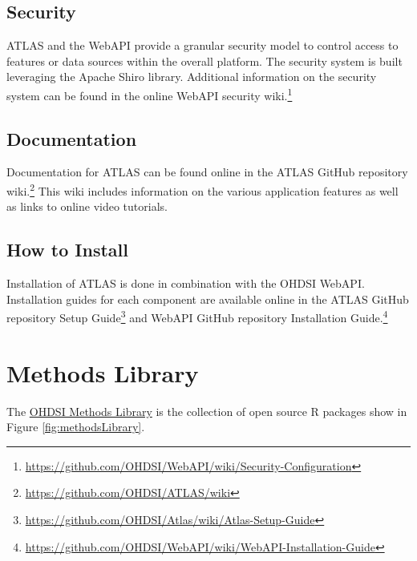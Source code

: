 \documentclass[11pt]{book}
\let\rmarkdownfootnote\footnote%
\def\footnote{\protect\rmarkdownfootnote}
\theoremstyle{definition}
\theoremstyle{definition}
\theoremstyle{definition}
\theoremstyle{remark}
\begin{document}
\subsection{Security}\label{security}

ATLAS and the WebAPI provide a granular security model to control access
to features or data sources within the overall platform. The security
system is built leveraging the Apache Shiro library. Additional
information on the security system can be found in the online WebAPI
security wiki.\footnote{\url{https://github.com/OHDSI/WebAPI/wiki/Security-Configuration}}

\subsection{Documentation}\label{documentation}

Documentation for ATLAS can be found online in the ATLAS GitHub
repository wiki.\footnote{\url{https://github.com/OHDSI/ATLAS/wiki}}
This wiki includes information on the various application features as
well as links to online video tutorials. 

\subsection{How to Install}\label{how-to-install}

Installation of ATLAS is done in combination with the OHDSI WebAPI.
Installation guides for each component are available online in the ATLAS
GitHub repository Setup Guide\footnote{\url{https://github.com/OHDSI/Atlas/wiki/Atlas-Setup-Guide}}
and WebAPI GitHub repository Installation Guide.\footnote{\url{https://github.com/OHDSI/WebAPI/wiki/WebAPI-Installation-Guide}}

\section{Methods Library}\label{methods-library}

The \href{https://ohdsi.github.io/MethodsLibrary/}{OHDSI Methods
Library} is the collection of open source R packages show in Figure
\ref{fig:methodsLibrary}. 
\end{document}
